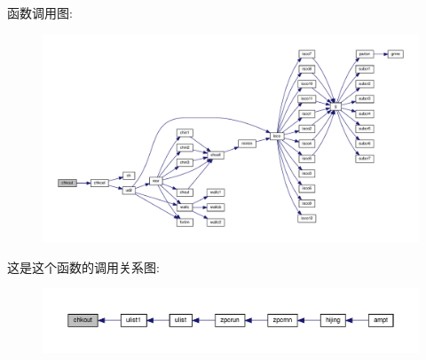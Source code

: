 函数调用图\+:
\nopagebreak
\begin{figure}[H]
\begin{center}
\leavevmode
\includegraphics[width=350pt]{chkout_8f90_a61e8243e9bf94c163dd7cc87d01f69d4_cgraph}
\end{center}
\end{figure}
这是这个函数的调用关系图\+:
\nopagebreak
\begin{figure}[H]
\begin{center}
\leavevmode
\includegraphics[width=350pt]{chkout_8f90_a61e8243e9bf94c163dd7cc87d01f69d4_icgraph}
\end{center}
\end{figure}
